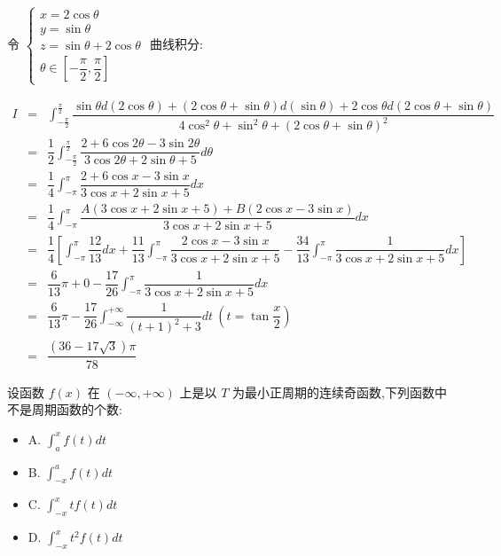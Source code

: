 \begin{solution}

	令 $\begin{cases}
		x = 2\cos \theta\\
		y = \sin \theta\\
		z = \sin \theta + 2\cos \theta\\
		\theta \in [-\dfrac{\pi}{2},\dfrac{\pi}{2}]
	\end{cases}$ 曲线积分:

	\begin{eqnarray*}
		I & = & \int_{-\frac{\pi}{2}}^{\frac{\pi}{2}}\dfrac{\sin\theta d(2\cos\theta) + (2\cos\theta+\sin\theta) d(\sin\theta) + 2\cos\theta d(2\cos\theta+\sin\theta)}{4\cos^{2}\theta+\sin^{2}\theta+(2\cos\theta + \sin\theta)^{2}}\\
		  & = & \dfrac{1}{2}\int_{-\frac{\pi}{2}}^{\frac{\pi}{2}}\dfrac{2+6\cos 2\theta-3\sin 2\theta}{3\cos 2\theta+2\sin\theta+5}d\theta\\
		  & = & \dfrac{1}{4}\int_{-\pi}^{\pi}\dfrac{2+6\cos x-3\sin x}{3\cos x+2\sin x+5}dx\\
		  & = & \dfrac{1}{4}\int_{-\pi}^{\pi}\dfrac{A(3\cos x +2\sin x+5)+B(2\cos x-3\sin x)}{3\cos x+2\sin x+5}dx\\
		  & = & \dfrac{1}{4}\left[ \int_{-\pi}^{\pi}\dfrac{12}{13}dx+\dfrac{11}{13}\int_{-\pi}^{\pi}\dfrac{2\cos x-3\sin x}{3\cos x+2\sin x+5}-\dfrac{34}{13}\int_{-\pi}^{\pi}\dfrac{1}{3\cos x+2\sin x+5}dx\right]\\
		  & = & \dfrac{6}{13}\pi+0-\dfrac{17}{26}\int_{-\pi}^{\pi}\dfrac{1}{3\cos x+2\sin x+5}dx\\
		  & = & \dfrac{6}{13}\pi - \dfrac{17}{26}\int_{-\infty}^{+\infty} \dfrac{1}{(t+1)^{2}+3}dt\ (t=\tan\dfrac{x}{2})\\
		  & = & \dfrac{(36-17\sqrt{3})\pi}{78}
	\end{eqnarray*}
\end{solution}

\begin{example}[][Exam: 36.1.14]
	设函数 $f(x)$ 在 $(-\infty,+\infty)$ 上是以 $T$ 为最小正周期的连续奇函数,下列函数中不是周期函数的个数:  
\begin{itemize}
	\item A. $\int_{a}^{x}f(t)dt$
	\item B. $\int_{-x}^{a}f(t)dt$
	\item C. $\int_{-x}^{x}tf(t)dt$
	\item D. $\int_{-x}^{x}t^2f(t)dt$
\end{itemize}
\end{example}

